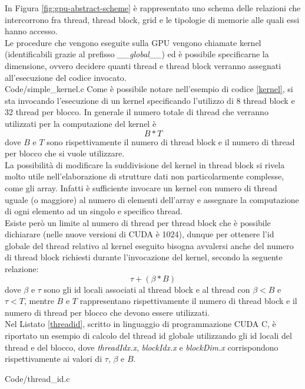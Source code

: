 In Figura \ref{fig:gpu-abstract-scheme} è rappresentato uno schema delle
relazioni che intercorrono fra thread, thread block, grid e le
tipologie di memorie alle quali essi hanno accesso.
\\
Le procedure che vengono eseguite sulla GPU vengono chiamate kernel
(identificabili grazie al prefisso \textit{\_\_global\_\_})
ed è possibile specificarne la dimensione, ovvero decidere quanti
thread e thread block verranno assegnati
all'esecuzione del codice invocato.
\\

    {Code/simple_kernel.c}
Come è possibile notare nell'esempio di codice \ref{kernel}, si sta invocando
l'esecuzione di un kernel specificando l'utilizzo di 8 thread block e
32 thread per blocco. In generale il numero totale di
thread che verranno utilizzati per la computazione del kernel è
$$B * T$$ dove $B$ e $T$
sono rispettivamente
il numero di thread block e il numero
di thread per blocco che si vuole utilizzare.
\\
La possibilità di modificare la suddivisione del kernel in thread block
si rivela molto utile nell'elaborazione di strutture dati non
particolarmente complesse, come gli array.
Infatti è sufficiente invocare un kernel con numero di thread
uguale (o maggiore) al numero di elementi dell'array e assegnare la
computazione di ogni elemento ad un singolo e specifico thread.
\\
Esiste però un limite al numero di thread per thread block che è possibile
dichiarare (nelle nuove versioni di CUDA è 1024), dunque per ottenere
l'id globale del thread relativo al kernel eseguito bisogna avvalersi anche
del numero di thread block richiesti durante l'invocazione del kernel,
secondo la seguente relazione:
$$\tau + (\beta * B)$$
dove $\beta$ e $\tau$ sono gli id locali associati al thread block e al thread 
con $\beta < B$ e $\tau < T$, mentre $B$ e $T$ rappresentano rispettivamente 
il numero di thread block e il numero di thread per blocco che devono essere 
utilizzati.
\\
Nel Listato \ref{threadid}, scritto in linguaggio di programmazione
CUDA C, è riportato un esempio di calcolo del
thread id globale utilizzando gli id locali del thread e del blocco, dove
\textit{threadIdx.x}, \textit{blockIdx.x} e \textit{blockDim.x} corrispondono
rispettivamente ai valori di $\tau$, $\beta$ e $B$.


    {Code/thread_id.c}

